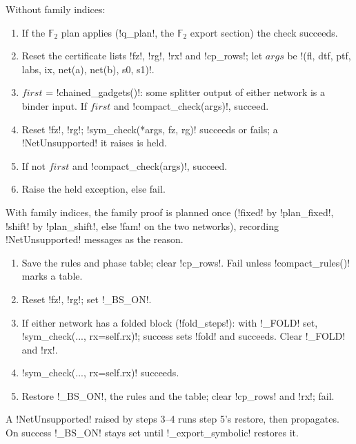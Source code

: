{{{\begin{algorithm}\label{alg:lean-export-sym-checkalg}
Without family indices:
\begin{enumerate}
\item If the $\mathbb{F}_2$ plan applies (\lexpy!q_plan!, the $\mathbb{F}_2$ export section) the
check succeeds.
\item Reset the certificate lists \lexpy!fz!, \lexpy!rg!, \lexpy!rx! and \lexpy!cp_rows!; let $\mathit{args}$
be \lexpy!(fl, dtf, ptf, labs, ix, net(a), net(b), s0, s1)!.
\item $\mathit{first}$ = \lexpy!chained_gadgets()!: some splitter output of either network is a
binder input. If $\mathit{first}$ and \lexpy!compact_check(args)!, succeed.
\item Reset \lexpy!fz!, \lexpy!rg!; \lexpy!sym_check(*args, fz, rg)! succeeds or fails; a
\lexpy!NetUnsupported! it raises is held.
\item If not $\mathit{first}$ and \lexpy!compact_check(args)!, succeed.
\item Raise the held exception, else fail.
\end{enumerate}
With family indices, the family proof is planned once (\lexpy!fixed! by \lexpy!plan_fixed!,
\lexpy!shift! by \lexpy!plan_shift!, else \lexpy!fam! on the two networks), recording
\lexpy!NetUnsupported! messages as the reason.
\end{algorithm}

\begin{algorithm}\label{alg:lean-export-sym-compactcheck}
\begin{enumerate}
\item Save the rules and phase table; clear \lexpy!cp_rows!. Fail unless \lexpy!compact_rules()!
marks a table.
\item Reset \lexpy!fz!, \lexpy!rg!; set \lexpy!_BS_ON!.
\item If either network has a folded block (\lexpy!fold_steps!): with \lexpy!_FOLD! set,
\lexpy!sym_check(..., rx=self.rx)!; success sets \lexpy!fold! and succeeds. Clear \lexpy!_FOLD! and
\lexpy!rx!.
\item \lexpy!sym_check(..., rx=self.rx)! succeeds.
\item Restore \lexpy!_BS_ON!, the rules and the table; clear \lexpy!cp_rows! and \lexpy!rx!; fail.
\end{enumerate}
A \lexpy!NetUnsupported! raised by steps 3--4 runs step 5's restore, then propagates.
On success \lexpy!_BS_ON! stays set until \lexpy!_export_symbolic! restores it.
\end{algorithm}

}}}
